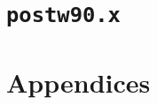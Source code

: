 \documentclass[a4paper,11pt,twoside]{book}
\begin{document}




















\part{\texttt{postw90.x}}











\appendix
\part{Appendices}





%



\end{document}
